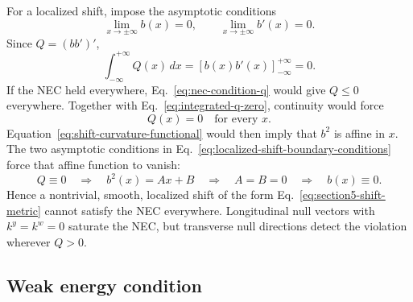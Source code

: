For a localized shift, impose the asymptotic conditions
\begin{equation}
  \lim_{x\to\pm\infty}b(x)
  =
  0,
  \qquad
  \lim_{x\to\pm\infty}b'(x)
  =
  0.
  \label{eq:localized-shift-boundary-conditions}
\end{equation}
Since \(Q=(bb')'\),
\begin{equation}
  \int_{-\infty}^{+\infty}
  Q(x)\,dx
  =
  \left[
    b(x)b'(x)
  \right]_{-\infty}^{+\infty}
  =
  0.
  \label{eq:integrated-q-zero}
\end{equation}
If the NEC held everywhere, Eq.~\eqref{eq:nec-condition-q} would give
\(Q\leq0\) everywhere.  Together with
Eq.~\eqref{eq:integrated-q-zero}, continuity would force
\begin{equation}
  Q(x)
  =
  0
  \quad
  \text{for every }x.
  \label{eq:q-identically-zero}
\end{equation}
Equation~\eqref{eq:shift-curvature-functional} would then imply that \(b^2\)
is affine in \(x\).  The two asymptotic conditions in
Eq.~\eqref{eq:localized-shift-boundary-conditions} force that affine function
to vanish:
\begin{equation}
  Q\equiv0
  \quad\Longrightarrow\quad
  b^2(x)=A x+B
  \quad\Longrightarrow\quad
  A=B=0
  \quad\Longrightarrow\quad
  b(x)\equiv0.
  \label{eq:nec-localized-no-go}
\end{equation}
Hence a nontrivial, smooth, localized shift of the form
Eq.~\eqref{eq:section5-shift-metric} cannot satisfy the NEC everywhere.
Longitudinal null vectors with \(k^y=k^w=0\) saturate the NEC, but transverse
null directions detect the violation wherever \(Q>0\).

\subsection{Weak energy condition}


